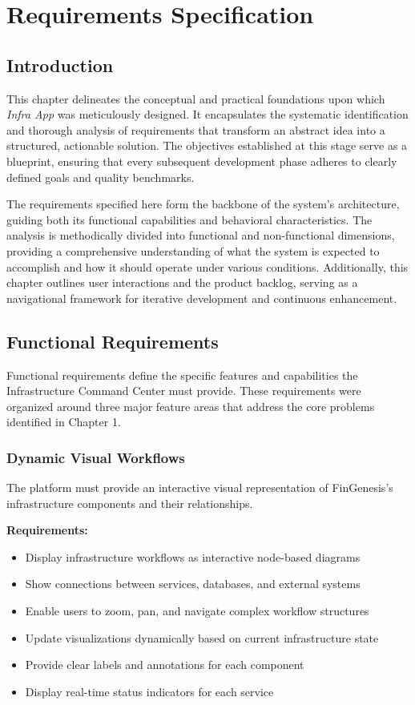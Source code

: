 \chapter{Requirements Specification}

\section{Introduction}
This chapter delineates the conceptual and practical foundations upon which \textit{Infra App} was meticulously designed. It encapsulates the systematic identification and thorough analysis of requirements that transform an abstract idea into a structured, actionable solution. The objectives established at this stage serve as a blueprint, ensuring that every subsequent development phase adheres to clearly defined goals and quality benchmarks.

The requirements specified here form the backbone of the system’s architecture, guiding both its functional capabilities and behavioral characteristics. The analysis is methodically divided into functional and non-functional dimensions, providing a comprehensive understanding of what the system is expected to accomplish and how it should operate under various conditions. Additionally, this chapter outlines user interactions and the product backlog, serving as a navigational framework for iterative development and continuous enhancement.
\clearpage

\section{Functional Requirements}

Functional requirements define the specific features and capabilities the Infrastructure Command Center must provide. These requirements were organized around three major feature areas that address the core problems identified in Chapter 1.

\subsection{Dynamic Visual Workflows}

The platform must provide an interactive visual representation of FinGenesis's infrastructure components and their relationships.

\textbf{Requirements:}
\begin{itemize}
    \item Display infrastructure workflows as interactive node-based diagrams
    \item Show connections between services, databases, and external systems
    \item Enable users to zoom, pan, and navigate complex workflow structures
    \item Update visualizations dynamically based on current infrastructure state
    \item Provide clear labels and annotations for each component
    \item Display real-time status indicators for each service 
\end{itemize}

